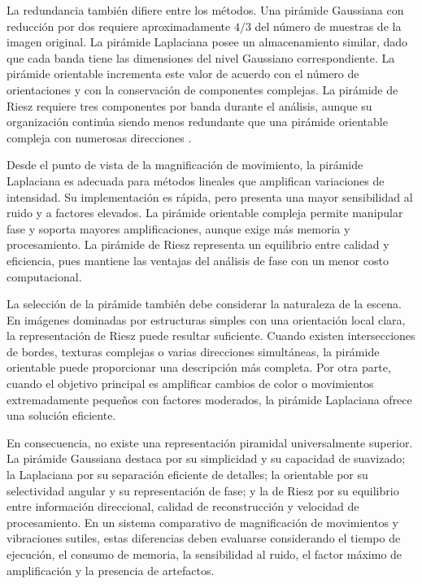 La redundancia también difiere entre los métodos. Una pirámide Gaussiana con reducción por dos requiere aproximadamente $4/3$ del número de muestras de la imagen original. La pirámide Laplaciana posee un almacenamiento similar, dado que cada banda tiene las dimensiones del nivel Gaussiano correspondiente. La pirámide orientable incrementa este valor de acuerdo con el número de orientaciones y con la conservación de componentes complejas. La pirámide de Riesz requiere tres componentes por banda durante el análisis, aunque su organización continúa siendo menos redundante que una pirámide orientable compleja con numerosas direcciones \cite{wadhwa2014riesz}.

Desde el punto de vista de la magnificación de movimiento, la pirámide Laplaciana es adecuada para métodos lineales que amplifican variaciones de intensidad. Su implementación es rápida, pero presenta una mayor sensibilidad al ruido y a factores elevados. La pirámide orientable compleja permite manipular fase y soporta mayores amplificaciones, aunque exige más memoria y procesamiento. La pirámide de Riesz representa un equilibrio entre calidad y eficiencia, pues mantiene las ventajas del análisis de fase con un menor costo computacional.

La selección de la pirámide también debe considerar la naturaleza de la escena. En imágenes dominadas por estructuras simples con una orientación local clara, la representación de Riesz puede resultar suficiente. Cuando existen intersecciones de bordes, texturas complejas o varias direcciones simultáneas, la pirámide orientable puede proporcionar una descripción más completa. Por otra parte, cuando el objetivo principal es amplificar cambios de color o movimientos extremadamente pequeños con factores moderados, la pirámide Laplaciana ofrece una solución eficiente.

En consecuencia, no existe una representación piramidal universalmente superior. La pirámide Gaussiana destaca por su simplicidad y su capacidad de suavizado; la Laplaciana por su separación eficiente de detalles; la orientable por su selectividad angular y su representación de fase; y la de Riesz por su equilibrio entre información direccional, calidad de reconstrucción y velocidad de procesamiento. En un sistema comparativo de magnificación de movimientos y vibraciones sutiles, estas diferencias deben evaluarse considerando el tiempo de ejecución, el consumo de memoria, la sensibilidad al ruido, el factor máximo de amplificación y la presencia de artefactos.

